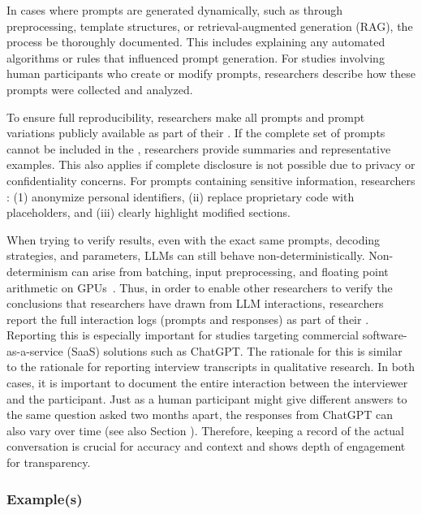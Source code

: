 In cases where prompts are generated dynamically, such as through preprocessing, template structures, or retrieval-augmented generation (RAG), the process \must be thoroughly documented.
This includes explaining any automated algorithms or rules that influenced prompt generation.
For studies involving human participants who create or modify prompts, researchers \must describe how these prompts were collected and analyzed.

To ensure full reproducibility, researchers \must make all prompts and prompt variations publicly available as part of their \supplementarymaterial.
If the complete set of prompts cannot be included in the \paper, researchers \should provide summaries and representative examples.
This also applies if complete disclosure is not possible due to privacy or confidentiality concerns.
For prompts containing sensitive information, researchers \must: (1) anonymize personal identifiers, (ii) replace proprietary code with placeholders, and (iii) clearly highlight modified sections.

When trying to verify results, even with the exact same prompts, decoding strategies, and parameters, LLMs can still behave non-deterministically.
Non-determinism can arise from batching, input preprocessing, and floating point arithmetic on GPUs~\cite{Chann2023}.
Thus, in order to enable other researchers to verify the conclusions that researchers have drawn from LLM interactions, researchers \should report the full interaction logs (prompts and responses) as part of their \supplementarymaterial.
Reporting this is especially important for studies targeting commercial software-as-a-service (SaaS) solutions such as ChatGPT.
The rationale for this is similar to the rationale for reporting interview transcripts in qualitative research.
In both cases, it is important to document the entire interaction between the interviewer and the participant.
Just as a human participant might give different answers to the same question asked two months apart, the responses from ChatGPT can also vary over time (see also Section \subjects).
Therefore, keeping a record of the actual conversation is crucial for accuracy and context and shows depth of engagement for transparency.

\subsubsection{Example(s)}

